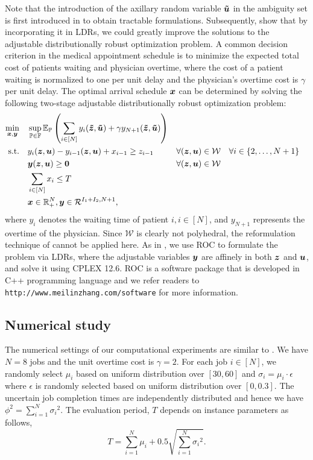 \documentclass[fleqn,orsc,blindrev]{informs4}
\newcommand{\mb}[1]{\mbox{\boldmath \ensuremath{#1}}}
\newcommand{\mbt}[1]{\mb{\tilde{#1}}}
\begin{document}
		Note that the introduction of the axillary random variable $\mbt{u}$ in the ambiguity set is first introduced in \cite{wks14} to obtain tractable formulations. Subsequently, \cite{bsz17} show that by incorporating it in LDRs, we could greatly improve the solutions to the adjustable distributionally robust optimization  problem. 
		A common decision criterion in the medical appointment schedule is to minimize the expected total cost of patients waiting and physician overtime, where the cost of a patient waiting is normalized to one per unit delay and the physician's overtime cost is $\gamma$ per unit delay. The optimal arrival schedule $\mb{x}$ can be determined by solving the following two-stage adjustable distributionally robust optimization problem:
\begin{equation}\label{mol:ApptScheduleELDRS}
			\begin{aligned}
				\min_{\boldsymbol{x}, \boldsymbol{y}} \quad & \sup_{\mathbb{P}\in \mathbb{F}}\mathbb{E}_\mathbb{P} \left(\sum_{i \in [N]}y_i(\mbt{z}, \mbt{u}) + \gamma y_{N+1}(\mbt{z}, \mbt{u})\right)  \\
				{\rm {\rm s.t.}}  \quad  & y_i(\mb{z}, \mb{u}) - y_{i-1}(\mb{z}, \mb{u}) + x_{i-1} \geq  {z}_{i-1} & \forall (\mb{z}, \mb{u})\in \mathcal{W} & \quad \forall i \in \{2,\dots ,N+1\} \\
				& \mb{y}(\mb{z}, \mb{u}) \geq \mb{0} &  \forall (\mb{z}, \mb{u})\in \mathcal{W}\\
				& \sum_{i \in [N]} x_i \leq T  \\
				& \mb{x} \in  \mathbb{R}^{N}_+, \mb{y} \in \mathcal{R}^{I_1+I_2, N+1},
			\end{aligned}
\end{equation}
		where $y_i$ denotes the waiting time of patient $i, i \in [N]$, and $y_{N+1}$ represents the overtime of the physician. Since $\mathcal{W}$ is clearly not polyhedral, the reformulation technique of \cite{bd16} cannot be applied here. As in \cite{bsz17}, we use ROC to formulate the problem via LDRs, where the adjustable variables $\mb{y}$ are affinely in both $\mb{z}$ and $\mb{u}$, and solve it using CPLEX 12.6. ROC is a software package that is developed in C++ programming language and we refer readers to \texttt{http://www.meilinzhang.com/software}  for more information.
		
		\subsection*{Numerical study}
		The numerical settings of our computational experiments are similar to \cite{bsz17}.
		We have $N=8$ jobs and the unit overtime cost is  $\gamma=2$.
		For each job $i\in[N]$, we  randomly select $\mu_{i}$ based on uniform distribution over $[30,60]$
		and $\sigma_i = \mu_i \cdot \epsilon$ where $\epsilon$ is randomly selected based on uniform distribution over $[0, 0.3]$.
		The uncertain job completion times are independently distributed and hence we have $ \phi^2 = \sum_{i=1}^{N} {\sigma_i}^2$.
		The evaluation period, $T$  depends on instance parameters as follows,
\begin{equation*}
		T = \sum_{i=1}^{N} \mu_i + 0.5 \sqrt{\sum_{i=1}^{N} {\sigma_i}^2}.
\end{equation*}
		
\end{document}
